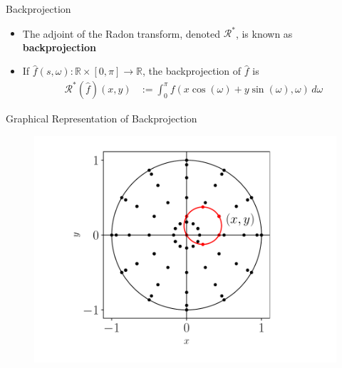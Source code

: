 \documentclass{beamer}
\begin{document}
\begin{frame}{Backprojection}
    \begin{itemize}
        \item The adjoint of the Radon transform, denoted $\mathcal{R}^{*}$, is known as \textbf{backprojection}
        \item If $\widehat{f}\left(s, \omega\right): \mathbb{R} \times [0, \pi] \rightarrow \mathbb{R}$, the backprojection of $\widehat{f}$ is
        \begin{align*}
            \mathcal{R}^{*} \left( \widehat{f} \right) (x, y) & := \int_{0}^{\pi} f(x \cos (\omega) + y \sin (\omega), \omega) \, d \omega
        \end{align*}
    \end{itemize}
\end{frame}

\begin{frame}{Graphical Representation of Backprojection}
    \begin{figure}[H]
        \centering
        \includegraphics[scale=0.65]{figures/backprojection.pdf}
    \end{figure}
\end{frame}

\end{document}
